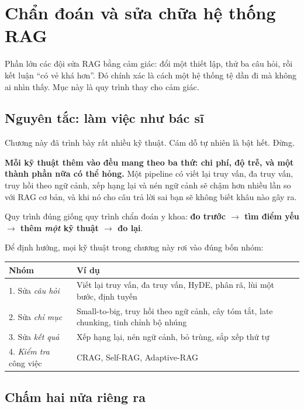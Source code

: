 
\section{Chẩn đoán và sửa chữa hệ thống RAG}
\label{sec:rag_diagnosis}

Phần lớn các đội sửa RAG bằng cảm giác: đổi một thiết lập, thử ba câu hỏi, rồi kết luận “có vẻ khá hơn”. Đó chính xác là cách một hệ thống tệ dần đi mà không ai nhìn thấy. Mục này là quy trình thay cho cảm giác.

\subsection{Nguyên tắc: làm việc như bác sĩ}
\label{ssec:rag_doctor}

Chương này đã trình bày rất nhiều kỹ thuật. Cám dỗ tự nhiên là bật hết. Đừng.

\textbf{Mỗi kỹ thuật thêm vào đều mang theo ba thứ: chi phí, độ trễ, và một thành phần nữa có thể hỏng.} Một pipeline có viết lại truy vấn, đa truy vấn, truy hồi theo ngữ cảnh, xếp hạng lại và nén ngữ cảnh sẽ chậm hơn nhiều lần so với RAG cơ bản, và khi nó cho câu trả lời sai bạn sẽ không biết khâu nào gây ra.

Quy trình đúng giống quy trình chẩn đoán y khoa: \textbf{đo trước $\rightarrow$ tìm điểm yếu $\rightarrow$ thêm \emph{một} kỹ thuật $\rightarrow$ đo lại}.

Để định hướng, mọi kỹ thuật trong chương này rơi vào đúng bốn nhóm:
\begin{center}
\small
\begin{tabular}{@{}ll@{}}
\toprule
\textbf{Nhóm} & \textbf{Ví dụ} \\
\midrule
1. Sửa \emph{câu hỏi} & Viết lại truy vấn, đa truy vấn, HyDE, phân rã, lùi một bước, định tuyến \\
2. Sửa \emph{chỉ mục} & Small-to-big, truy hồi theo ngữ cảnh, cây tóm tắt, late chunking, tinh chỉnh bộ nhúng \\
3. Sửa \emph{kết quả} & Xếp hạng lại, nén ngữ cảnh, bỏ trùng, sắp xếp thứ tự \\
4. \emph{Kiểm tra} công việc & CRAG, Self-RAG, Adaptive-RAG \\
\bottomrule
\end{tabular}
\end{center}

\subsection{Chấm hai nửa riêng ra}
\label{ssec:score_two_halves}


